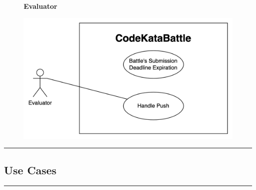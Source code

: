\documentclass{Configuration_Files/Template}
\begin{document}
\begin{figure}[H]
\textbf{Evaluator}\par\medskip
\includegraphics[scale = 0.45]{Images/UseCaseDiagrams/CKB_Autonomous_UseCaseDiagram.png}\\
\centering
\end{figure}

{\color{bluepoli}\rule{\linewidth}{0.1pt}}

\subsection{Use Cases}

{\color{bluepoli}\rule{\linewidth}{0.1pt}}
\end{document}
